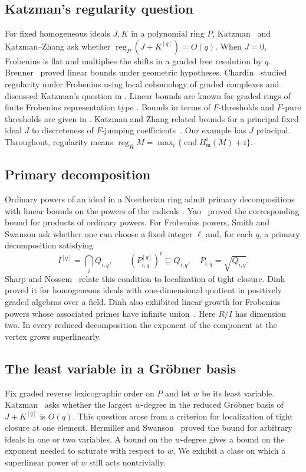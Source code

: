 \documentclass[11pt,a4paper,reqno]{amsart}
\numberwithin{equation}{section}
\theoremstyle{plain}
\theoremstyle{definition}
\theoremstyle{remark}
\newcommand{\mm}{\mathfrak m}
\DeclareMathOperator{\End}{end}
\DeclareMathOperator{\reg}{reg}
\begin{document}
\subsection*{Katzman's regularity question}
For fixed homogeneous ideals $J,K$ in a polynomial ring $P$,
Katzman~\cite[Question 2]{Katzman} and Katzman--Zhang
\cite[Question 1.4]{KZ} ask whether $\reg_P(J+K^{[q]})=O(q)$.
When $J=0$, Frobenius is flat and multiplies the shifts in a graded
free resolution by $q$. Brenner~\cite{Brenner} proved linear bounds
under geometric hypotheses. Chardin~\cite{Chardin} studied regularity
under Frobenius using local cohomology of graded complexes and discussed
Katzman's question in \cite{ChardinSurvey}. Linear bounds are known for
graded rings of finite Frobenius representation type
\cite[\S7]{KSSZ}. Bounds in terms of $F$-thresholds and $F$-pure thresholds are given in \cite{DSNP}.
Katzman and Zhang related bounds for a principal fixed ideal $J$ to
discreteness of $F$-jumping coefficients~\cite[Theorem 3.3]{KZ}.
Our example has $J$ principal. Throughout, regularity means
$\reg_R M=\max_i\{\End H^i_{\mm}(M)+i\}$.

\subsection*{Primary decomposition}
Ordinary powers of an ideal in a Noetherian ring admit primary
decompositions with linear bounds on the powers of the radicals
\cite{Swanson}. Yao~\cite{Yao} proved the corresponding bound for
products of ordinary powers. For Frobenius powers, Smith and Swanson
\cite[p.~3071]{SS} ask whether one can choose a fixed integer $\ell$
and, for each $q$, a primary decomposition satisfying
\begin{equation}\label{eq:SS-question}
 I^{[q]}=\bigcap_i Q_{i,q},\qquad
 (P_{i,q}^{[q]})^\ell\subseteq Q_{i,q},
 \quad P_{i,q}=\sqrt{Q_{i,q}}.
\end{equation}
Sharp and Nossem~\cite{SN} relate this condition to localization
of tight closure. Dinh~\cite[Theorem 2.2]{Dinh} proved it for
homogeneous ideals with one-dimensional quotient in positively
graded algebras over a field. Dinh also exhibited linear growth for
Frobenius powers whose associated primes have infinite union~\cite{Dinh}.
Here $R/I$ has dimension two. In every reduced decomposition the exponent
of the component at the vertex grows superlinearly.

\subsection*{The least variable in a Gr\"obner basis}
Fix graded reverse lexicographic order on $P$ and let $w$ be its least
variable. Katzman~\cite[Conjecture 4]{Katzman} asks whether the
largest $w$-degree in the reduced Gr\"obner basis of $J+K^{[q]}$
is $O(q)$. This question arose from a criterion for localization of
tight closure at one element. Hermiller and Swanson~\cite[Theorem 2.1]{HS}
proved the bound for arbitrary ideals in one or two variables. A bound on the $w$-degree gives a bound on the exponent needed to saturate with respect to $w$. We exhibit a class on which a superlinear power of $w$
still acts nontrivially.
\end{document}
